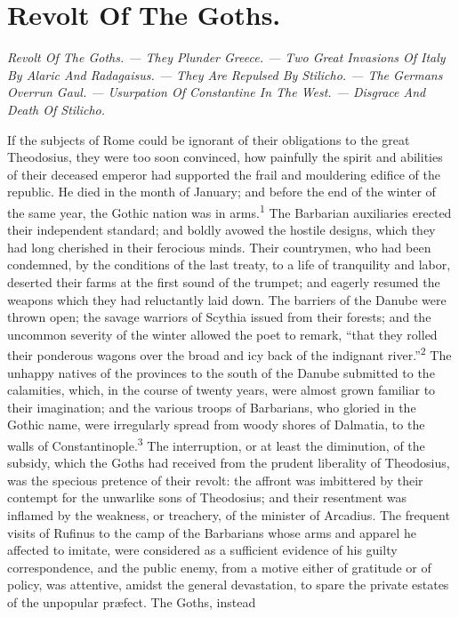 \chapter{Revolt Of The Goths.}

\textit{Revolt Of The Goths. — They Plunder Greece. — Two Great Invasions Of
Italy By Alaric And Radagaisus. — They Are Repulsed By Stilicho. — The
Germans Overrun Gaul. — Usurpation Of Constantine In The
West. — Disgrace And Death Of Stilicho.}

If the subjects of Rome could be ignorant of their obligations to
the great Theodosius, they were too soon convinced, how painfully
the spirit and abilities of their deceased emperor had supported
the frail and mouldering edifice of the republic. He died in the
month of January; and before the end of the winter of the same
year, the Gothic nation was in arms.\textsuperscript{1} The Barbarian auxiliaries
erected their independent standard; and boldly avowed the hostile
designs, which they had long cherished in their ferocious minds.
Their countrymen, who had been condemned, by the conditions of
the last treaty, to a life of tranquility and labor, deserted
their farms at the first sound of the trumpet; and eagerly
resumed the weapons which they had reluctantly laid down. The
barriers of the Danube were thrown open; the savage warriors of
Scythia issued from their forests; and the uncommon severity of
the winter allowed the poet to remark, “that they rolled their
ponderous wagons over the broad and icy back of the indignant
river.”\textsuperscript{2} The unhappy natives of the provinces to the south of
the Danube submitted to the calamities, which, in the course of
twenty years, were almost grown familiar to their imagination;
and the various troops of Barbarians, who gloried in the Gothic
name, were irregularly spread from woody shores of Dalmatia, to
the walls of Constantinople.\textsuperscript{3} The interruption, or at least the
diminution, of the subsidy, which the Goths had received from the
prudent liberality of Theodosius, was the specious pretence of
their revolt: the affront was imbittered by their contempt for
the unwarlike sons of Theodosius; and their resentment was
inflamed by the weakness, or treachery, of the minister of
Arcadius. The frequent visits of Rufinus to the camp of the
Barbarians whose arms and apparel he affected to imitate, were
considered as a sufficient evidence of his guilty correspondence,
and the public enemy, from a motive either of gratitude or of
policy, was attentive, amidst the general devastation, to spare
the private estates of the unpopular præfect. The Goths, instead
